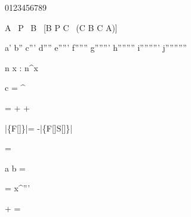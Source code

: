 0123456789

\forall A \, \exists P \, \forall B \, [B \in P \Leftrightarrow \forall C \, (C \in B \Rightarrow C \in A)]

a' b'' c''' d'''' e''''' f'''''' g''''''' h'''''''' i''''''''' j''''''''''

\forall n \in {} \exists \; x \; \in {} \; : \; n^x \not\in {}

c = ^ 

\mathrm{\nabla} \cdot {} =  +  + 

\left\langle\psi\left|\left\{\frac{\delta}{\delta\phi}F[\phi]\right\}\right|\psi\right\rangle = -\left\langle\psi\left|\left\{F[\phi]\frac{\delta}{\delta\phi}S[\phi]\right\}\right|\psi\right\rangle

  

 = 

a \not{=} b \quad \not{\alpha}= \quad {}

 = x^{'''}

 + =

